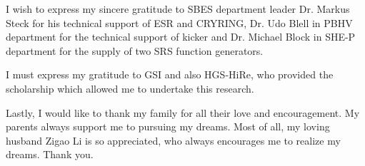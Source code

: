 I wish to express my sincere gratitude to \gls{SBES} department leader Dr. Markus Steck for his technical support of ESR and CRYRING, Dr. Udo Blell in \gls{PBHV} department for the technical support of kicker and Dr. Michael Block in \gls{SHE-P} department for the supply of two SRS function generators. 

I must express my gratitude to GSI and also HGS-HiRe, who provided the scholarship which allowed me to undertake this research.


Lastly, I would like to thank my family for all their love and encouragement. My parents always support me to pursuing my dreams. Most of all, my loving husband Zigao Li is so appreciated, who always encourages me to realize my dreams. Thank you.




